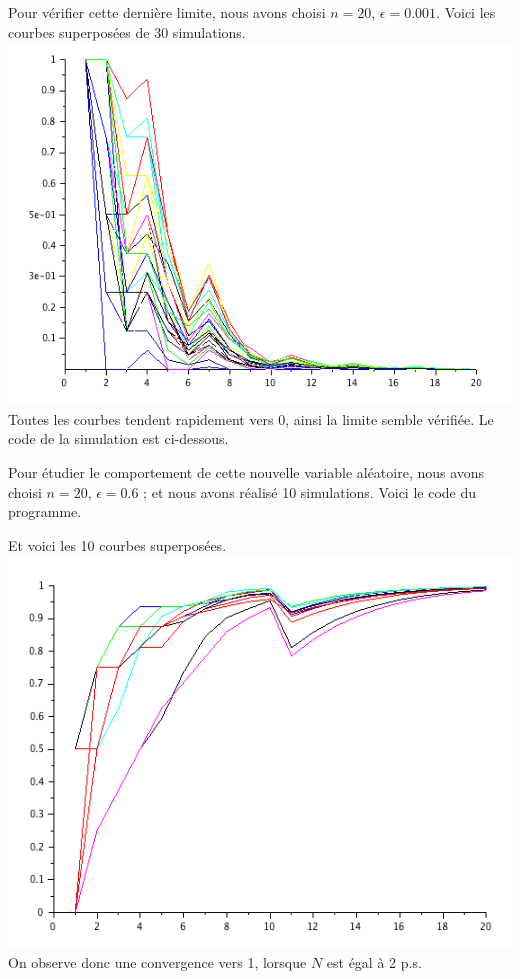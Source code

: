\documentclass[12pt,titlepage=true]{article}
\begin{document}
		\subsection{} %
		Pour vérifier cette dernière limite, nous avons choisi $n = 20$, $\epsilon = 0.001$. Voici les courbes superposées de 30 simulations. \\
		\includegraphics{../Scilab/Images/2_3_1.png}
		Toutes les courbes tendent rapidement vers 0, ainsi la limite semble vérifiée. Le code de la simulation est ci-dessous.
		
		
		Pour étudier le comportement de cette nouvelle variable aléatoire, nous avons choisi $n = 20$, $\epsilon = 0.6$ ; et nous avons réalisé 10 simulations. Voici le code du programme.
		
		Et voici les 10 courbes superposées. \\
		\includegraphics{../Scilab/Images/2_3_2.png}
		On observe donc une convergence vers 1, lorsque $N$ est égal à 2 p.s.
\end{document}
